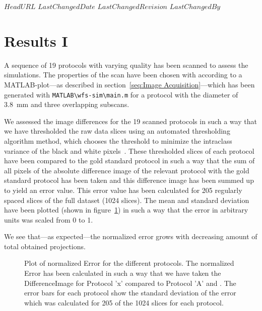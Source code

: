 \svnidlong
{$HeadURL$}
{$LastChangedDate$}
{$LastChangedRevision$}
{$LastChangedBy$}

\begin{center}
\end{center}

\section{Results I}
\label{sec: Results I}
A sequence of 19 protocols with varying quality has been scanned to assess the simulations. The properties of the scan have been chosen with according to a MATLAB-plot---as described in section~\ref{seq:Image Acquisition}---which has been generated with \verb+MATLAB\wfs-sim\main.m+ for a protocol with the diameter of \SI{3.8}{mm} and three overlapping subscans.

We assessed the image differences for the 19 scanned protocols in such a way that we have thresholded the raw data slices using an automated thresholding algorithm method, which chooses the threshold to minimize the intraclass variance of the black and white pixels~\cite{Otsu1979}. These thresholded slices of each protocol have been compared to the gold standard protocol in such a way that the sum of all pixels of the absolute difference image of the relevant protocol with the gold standard protocol has been taken and this difference image has been summed up to yield an error value. This error value has been calculated for 205 regularly spaced slices of the full dataset (1024 slices). The mean and standard deviation have been plotted (shown in figure~\ref{fig:NormalizedErrorPlot}) in such a way that the error in arbitrary units was scaled from 0 to 1.

We see that---as expected---the normalized error grows with decreasing amount of total obtained projections.

\begin{figure}
	\centering
		
	\caption{Plot of normalized Error for the different protocols. The normalized Error has been calculated in such a way that we have taken the DifferenceImage for Protocol 'x' compared to Protocol 'A' and . The error bars for each protocol show the standard deviation of the error which was calculated for 205 of the 1024 slices for each protocol.}
	\label{fig:NormalizedErrorPlot}
\end{figure}


